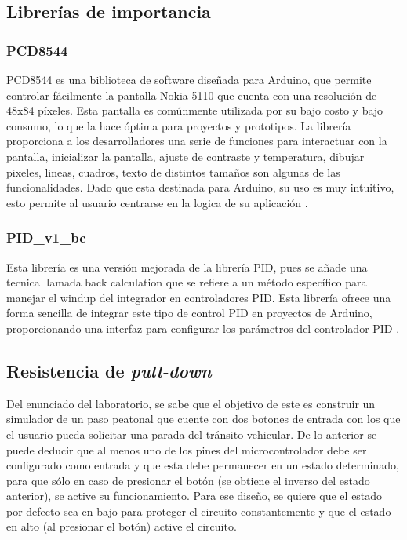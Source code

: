 \subsection{Librerías de importancia}

\subsubsection{PCD8544}
PCD8544 es una biblioteca de software diseñada para Arduino, que permite controlar fácilmente la pantalla Nokia 5110 que cuenta con una resolución de 48x84 píxeles. Esta pantalla es comúnmente utilizada por su bajo costo y bajo consumo, lo que la hace óptima para proyectos y prototipos. La librería proporciona a los desarrolladores una serie de funciones para interactuar con la pantalla, inicializar la pantalla, ajuste de contraste y temperatura, dibujar pixeles, lineas, cuadros, texto de distintos tamaños son algunas de las funcionalidades. Dado que esta destinada para Arduino, su uso es muy intuitivo, esto permite al usuario centrarse en la logica de su aplicación \cite{Rodrigues}.

\subsubsection{PID\_v1\_bc}
Esta librería es una versión mejorada de la librería PID, pues se añade una tecnica llamada  back calculation que se refiere a un método específico para manejar el windup del integrador en controladores PID. Esta librería ofrece una forma sencilla de integrar este tipo de control PID en proyectos de Arduino, proporcionando una interfaz para configurar los parámetros del controlador PID \cite{Forrest}.

\subsection{Resistencia de \textit{pull-down}}\label{sec:cir0}
Del enunciado del laboratorio, se sabe que el objetivo de este es construir un simulador de un paso peatonal que cuente con dos botones de entrada con los que el usuario pueda solicitar una parada del tránsito vehicular. De lo anterior se puede deducir que al menos uno de los pines del microcontrolador debe ser configurado como entrada y que esta debe permanecer en un estado determinado, para que sólo en caso de presionar el botón (se obtiene el inverso del estado anterior), se active su funcionamiento. Para ese diseño, se quiere que el estado por defecto sea en bajo para proteger el circuito constantemente y que el estado en alto (al presionar el botón) active el circuito. 

